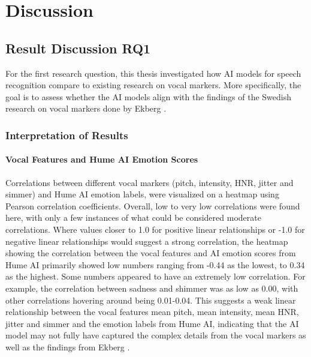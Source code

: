 \chapter{Discussion}
\label{sec:discussion}

\section{Result Discussion RQ1}
For the first research question, this thesis investigated how AI models for speech recognition compare to existing research on vocal markers. More specifically, the goal is to assess whether the AI models align with the findings of the Swedish research on vocal markers done by Ekberg \autocite{Ekberg2023}.
\subsection{Interpretation of Results}
\subsubsection{Vocal Features and Hume AI Emotion Scores}
Correlations between different vocal markers (pitch, intensity, HNR, jitter and simmer) and Hume AI emotion labels, were visualized on a heatmap using Pearson correlation coefficients. Overall, low to very low correlations were found here, with only a few instances of what could be considered moderate correlations.  
Where values closer to 1.0 for positive linear relationships or -1.0 for negative linear relationships would suggest a strong correlation, the heatmap showing the correlation between the vocal features and AI emotion scores from Hume AI primarily showed low numbers ranging from -0.44 as the lowest, to 0.34 as the highest. Some numbers appeared to have an extremely low correlation. For example, the correlation between sadness and shimmer was as low as 0.00, with other correlations hovering around being 0.01-0.04.
This suggests a weak linear relationship between the vocal features mean pitch, mean intensity, mean HNR, jitter and simmer and the emotion labels from Hume AI, indicating that the AI model may not fully have captured the complex details from the vocal markers as well as the findings from Ekberg \autocite{Ekberg2023}.

